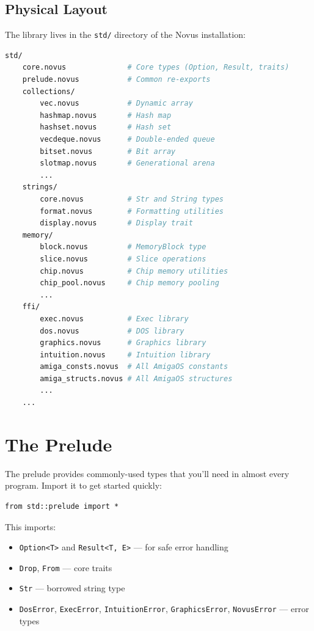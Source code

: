 \subsection{Physical Layout}

The library lives in the \texttt{std/} directory of the Novus installation:

\begin{lstlisting}[language=bash]
std/
    core.novus              # Core types (Option, Result, traits)
    prelude.novus           # Common re-exports
    collections/
        vec.novus           # Dynamic array
        hashmap.novus       # Hash map
        hashset.novus       # Hash set
        vecdeque.novus      # Double-ended queue
        bitset.novus        # Bit array
        slotmap.novus       # Generational arena
        ...
    strings/
        core.novus          # Str and String types
        format.novus        # Formatting utilities
        display.novus       # Display trait
    memory/
        block.novus         # MemoryBlock type
        slice.novus         # Slice operations
        chip.novus          # Chip memory utilities
        chip_pool.novus     # Chip memory pooling
        ...
    ffi/
        exec.novus          # Exec library
        dos.novus           # DOS library
        graphics.novus      # Graphics library
        intuition.novus     # Intuition library
        amiga_consts.novus  # All AmigaOS constants
        amiga_structs.novus # All AmigaOS structures
        ...
    ...
\end{lstlisting}

\section{The Prelude}
\label{sec:stdlib-prelude}

The prelude provides commonly-used types that you'll need in almost every program. Import it to get started quickly:

\begin{lstlisting}
from std::prelude import *
\end{lstlisting}

This imports:

\begin{itemize}
    \item \texttt{Option<T>} and \texttt{Result<T, E>} --- for safe error handling
    \item \texttt{Drop}, \texttt{From} --- core traits
    \item \texttt{Str} --- borrowed string type
    \item \texttt{DosError}, \texttt{ExecError}, \texttt{IntuitionError}, \texttt{GraphicsError}, \texttt{NovusError} --- error types
\end{itemize}

